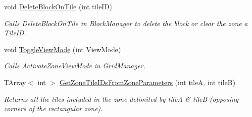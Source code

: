 \begin{DoxyCompactItemize}
void \mbox{\hyperlink{class_a_t_t___player_grid_camera_a4ee51f1a11796e95ddef813ba85f101e}{Delete\+Block\+On\+Tile}} (int tile\+ID)
\begin{DoxyCompactList}\small\item\em Calls Delete\+Block\+On\+Tile in Block\+Manager to delete the block or clear the zone a Tile\+ID. \end{DoxyCompactList}\item 
void \mbox{\hyperlink{class_a_t_t___player_grid_camera_a4a5097bfe8542f4065317a50725d25a7}{Toggle\+View\+Mode}} (int View\+Mode)
\begin{DoxyCompactList}\small\item\em Calls Activate\+Zone\+View\+Mode in Grid\+Manager. \end{DoxyCompactList}\item 
T\+Array$<$ int $>$ \mbox{\hyperlink{class_a_t_t___player_grid_camera_afb96fd6854de63d2871cff6402622d9f}{Get\+Zone\+Tile\+I\+Ds\+From\+Zone\+Parameters}} (int tileA, int tileB)
\begin{DoxyCompactList}\small\item\em Returns all the tiles included in the zone delimited by tileA \& tileB (opposing corners of the rectangular zone). \end{DoxyCompactList}\end{DoxyCompactItemize}
